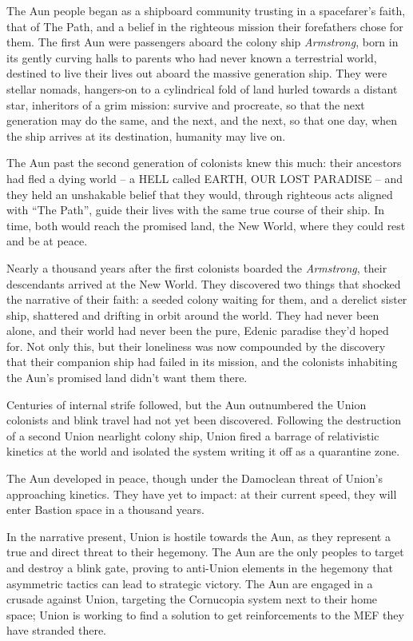 The Aun people began as a shipboard community trusting in a spacefarer's faith, that of The
Path, and a belief in the righteous mission their forefathers chose for them. The first Aun were
passengers aboard the colony ship \textit{Armstrong}, born in its gently curving halls to parents who
had never known a terrestrial world, destined to live their lives out aboard the massive generation
ship. They were stellar nomads, hangers-on to a cylindrical fold of land hurled towards a distant
star, inheritors of a grim mission: survive and procreate, so that the next generation may do the
same, and the next, and the next, so that one day, when the ship arrives at its destination,
humanity may live on.

The Aun past the second generation of colonists knew this much: their ancestors had fled a
dying world -- a HELL called EARTH, OUR LOST PARADISE -- and they held an unshakable
belief that they would, through righteous acts aligned with “The Path”, guide their lives with the
same true course of their ship. In time, both would reach the promised land, the New World,
where they could rest and be at peace.

Nearly a thousand years after the first colonists boarded the \textit{Armstrong}, their descendants
arrived at the New World. They discovered two things that shocked the narrative of their faith: a
seeded colony waiting for them, and a derelict sister ship, shattered and drifting in orbit around
the world. They had never been alone, and their world had never been the pure, Edenic paradise
they’d hoped for. Not only this, but their loneliness was now compounded by the discovery that
their companion ship had failed in its mission, and the colonists inhabiting the Aun’s promised
land didn’t want them there.

Centuries of internal strife followed, but the Aun outnumbered the Union colonists and blink
travel had not yet been discovered. Following the destruction of a second Union nearlight colony
ship, Union fired a barrage of relativistic kinetics at the world and isolated the system writing it
off as a quarantine zone.

The Aun developed in peace, though under the Damoclean threat of Union’s approaching
kinetics. They have yet to impact: at their current speed, they will enter Bastion space in a
thousand years.

In the narrative present, Union is hostile towards the Aun, as they represent a true and direct
threat to their hegemony. The Aun are the only peoples to target and destroy a blink gate,
proving to anti-Union elements in the hegemony that asymmetric tactics can lead to strategic
victory. The Aun are engaged in a crusade against Union, targeting the Cornucopia system next
to their home space; Union is working to find a solution to get reinforcements to the MEF they
have stranded there.

